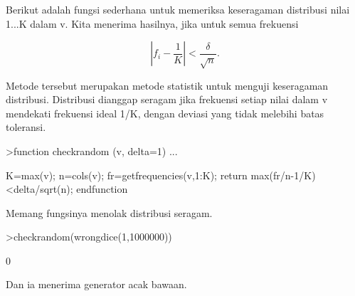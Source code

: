 \documentclass[a4paper,10pt]{article}
\begin{document}
\begin{eulernotebook}
\begin{eulercomment}
\begin{eulercomment}
\begin{eulercomment}
Berikut adalah fungsi sederhana untuk memeriksa keseragaman distribusi
nilai 1...K dalam v. Kita menerima hasilnya, jika untuk semua
frekuensi

\end{eulercomment}
\begin{eulerformula}
\[
\left|f_i-\frac{1}{K}\right| < \frac{\delta}{\sqrt{n}}.
\]
\end{eulerformula}
\begin{eulercomment}
Metode tersebut merupakan metode statistik untuk menguji keseragaman
distribusi. Distribusi dianggap seragam jika frekuensi setiap nilai
dalam v mendekati frekuensi ideal 1/K, dengan deviasi yang tidak
melebihi batas toleransi.
\end{eulercomment}
\begin{eulerprompt}
>function checkrandom (v, delta=1) ...
\end{eulerprompt}
\begin{eulerudf}
    K=max(v); n=cols(v);
    fr=getfrequencies(v,1:K);
    return max(fr/n-1/K)<delta/sqrt(n);
    endfunction
\end{eulerudf}
\begin{eulercomment}
Memang fungsinya menolak distribusi seragam.
\end{eulercomment}
\begin{eulerprompt}
>checkrandom(wrongdice(1,1000000))
\end{eulerprompt}
\begin{euleroutput}
  0
\end{euleroutput}
\begin{eulercomment}
Dan ia menerima generator acak bawaan.


\end{eulercomment}
\end{eulercomment}
\end{eulercomment}
\end{eulernotebook}
\end{document}
